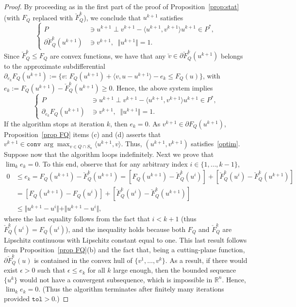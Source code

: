 \documentclass[hidelinks,onefignum,onetabnum]{siamart250211}
\theoremstyle{definition}
\theoremstyle{remark}
\newcommand{\R}{\mathbb R}
\newcommand{\inner}[2]{\langle#1,#2\rangle}
\newcommand{\norm}[1]{\textstyle{\Vert} #1 \textstyle{\Vert}}
\begin{document}
\begin{proof}
    By proceeding as in the first part of the proof of Proposition~\ref{prop:stat} (with $F_Q$ replaced with $\check F_Q^k$), we conclude that $u^{k+1}$ satisfies 
    \[
\left\{
\begin{array}{llll}
P&\ni u^{k+1} \perp   v^{k+1}  - \inner{u^{k+1}}{ v^{k+1}} u^{k+1} \in P^*,\\
\partial \check F^k_Q(u^{k+1}) &\ni   v^{k+1}  ,\;\; \norm{u^{k+1}} =1.
\end{array}
\right.
\]
Since $\check F^k_Q \leq F_Q$ are convex functions, we have that
any $\check v \in \partial \check F_Q^k(u^{k+1})$ belongs to the approximate subdifferential $\partial_{e_k} F_Q(u^{k+1}) :=\{v:\, F_Q(u^{k+1}) +\inner{v}{u-u^{k+1}}-e_k \leq F_Q(u)\}$,  with $e_k:=  F_Q(u^{k+1}) - \check F_Q^k(u^{k+1}) \geq 0$. Hence, the above system implies
    \begin{equation}\label{aux0}
\left\{
\begin{array}{llll}
P&\ni u^{k+1} \perp   v^{k+1}  - \inner{u^{k+1}}{v^{k+1}} u^{k+1} \in P^*,\\
\partial_{e_k} F_Q(u^{k+1}) &\ni  v^{k+1}  ,\;\; \norm{u^{k+1}} =1.
\end{array}
\right.
\end{equation}
If the algorithm stops at iteration $k$, then $e_k=0$. As $v^{k+1} \in \partial F_Q(u^{k+1})$, Proposition~\ref{prop FQ} items (c) and (d) asserts that $v^{k+1}  \in \mathtt{conv}\, \arg\max_{v\in Q\cap S_n}\inner{u^{k+1}}{v}$.
Thus, $(u^{k+1},v^{k+1})$ satisfies~\eqref{optim}. Suppose now that the algorithm loops indefinitely.
Next we prove that $\lim_k e_k =0$. To this end, observe that for any arbitrary index $i \in \{1,\ldots,k-1\}$,
\begin{align*}
0 & \leq e_k=  F_Q(u^{k+1}) - \check F_Q^k(u^{k+1}) = [F_Q(u^{k+1})-\check F^k_Q(u^{i})] +[\check F^k_Q(u^{i}) - \check F_Q^k(u^{k+1})]\\
& =  [F_Q(u^{k+1})-F_Q(u^{i})] +[\check F^k_Q(u^{i}) - \check F_Q^k(u^{k+1})]\\ 
&\leq \norm{u^{k+1}-u^i}+ \norm{u^{k+1}-u^i},
\end{align*}
where the last  equality follows from the fact that $i<k+1$ (thus $\check F^k_Q(u^{i}) = F_Q(u^{i})$), and the inequality holds because both $F_Q$ and $\check F^k_Q$ are Lipschitz continuous with Lipschitz constant equal to one. This last result follows from Proposition~\ref{prop FQ}(b) and the fact that, being a cutting-plane function, $\partial \check F^k_Q(u)$ is contained in the convex hull of $\{v^1,\ldots, v^k\}$.
As a result, if there would exist $\epsilon >0$ such that $\epsilon \leq  e_k$ for all $k$ large enough, then the bounded sequence $\{u^k\}$ would not have a convergent subsequence, which is impossible in $\R^n$. 
Hence, $\lim_k e_k =0$. (Thus the algorithm terminates after finitely many iterations provided $\mathtt{tol}>0$.)


\end{proof}
\end{document}
